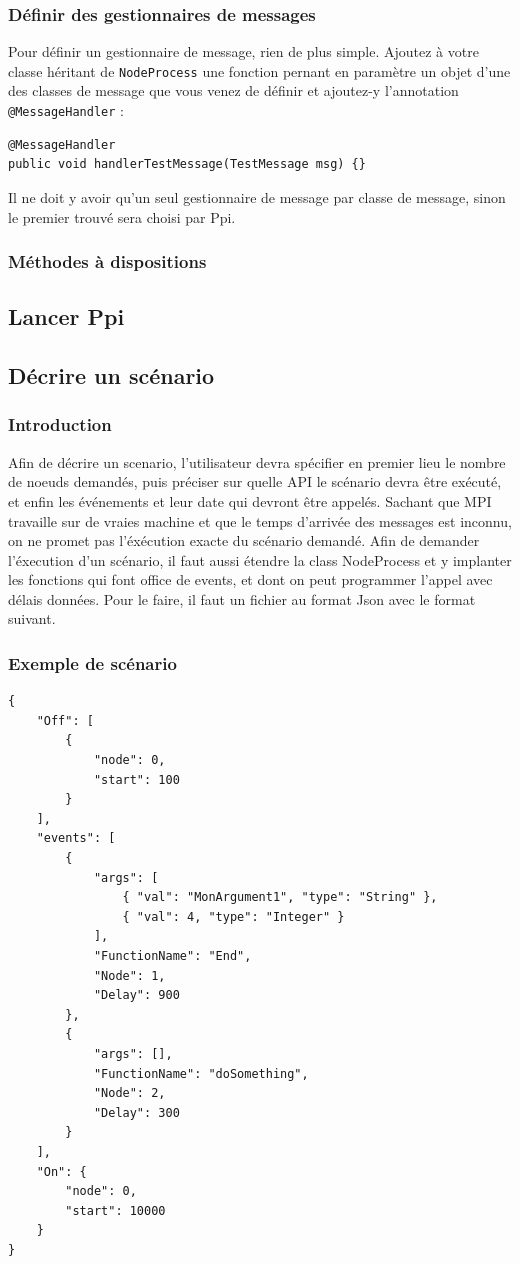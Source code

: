\documentclass{article}
\begin{document}
		\subsubsection{Définir des gestionnaires de messages}
		Pour définir un gestionnaire de message, rien de plus simple. Ajoutez à votre classe
		héritant de \lstinline{NodeProcess} une fonction pernant en paramètre un objet d'une des
		classes de message que vous venez de définir et ajoutez-y l'annotation
		\lstinline{@MessageHandler} :
		\begin{lstlisting}
@MessageHandler
public void handlerTestMessage(TestMessage msg) {}
		\end{lstlisting}

		Il ne doit y avoir qu'un seul gestionnaire de message par classe de message, sinon le
		premier trouvé sera choisi par Ppi.

		\subsubsection{Méthodes à dispositions}

		\subsection{Lancer Ppi}
		\subsection{Décrire un scénario}
		\subsubsection{Introduction}
		Afin de décrire un scenario, l'utilisateur devra spécifier en premier lieu le nombre de noeuds demandés, puis préciser sur quelle API le scénario devra être exécuté, et enfin les événements et leur date qui devront être appelés.
		\newline
		Sachant que MPI travaille sur de vraies machine et que le temps d'arrivée des messages est inconnu, on ne promet pas l'éxécution exacte du scénario demandé.
			\newline
			\newline
			Afin de demander l'éxecution d'un scénario, il faut aussi étendre la class NodeProcess et y 
			implanter les fonctions qui font office de events, et dont on peut programmer l'appel avec délais données.
			Pour le faire, il faut un fichier au format Json avec le format suivant.
			\subsubsection{Exemple de scénario}
			\begin{lstlisting}
{
	"Off": [
		{
			"node": 0,
			"start": 100
		}
	],
	"events": [
		{
			"args": [
				{ "val": "MonArgument1", "type": "String" },
				{ "val": 4, "type": "Integer" }
			],
			"FunctionName": "End",
			"Node": 1,
			"Delay": 900
		},
		{
			"args": [],
			"FunctionName": "doSomething",
			"Node": 2,
			"Delay": 300
		}
	],
	"On": {
		"node": 0,
		"start": 10000
	}
}
			\end{lstlisting}
\end{document}
